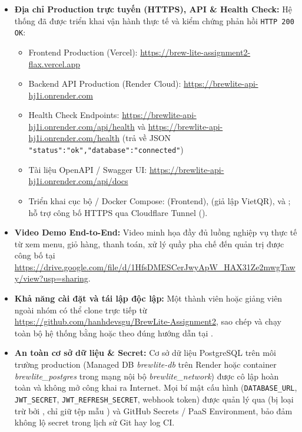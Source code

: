 \documentclass[12pt,a4paper]{report}
\begin{document}
\begin{itemize}[leftmargin=*]
\item \textbf{Địa chỉ Production trực tuyến (HTTPS), API \& Health Check:} Hệ thống đã được triển khai vận hành thực tế và kiểm chứng phản hồi \texttt{HTTP 200 OK}:
  \begin{itemize}[nosep]
  \item Frontend Production (Vercel): \url{https://brew-lite-assignment2-flax.vercel.app}
  \item Backend API Production (Render Cloud): \url{https://brewlite-api-hj1i.onrender.com}
  \item Health Check Endpoints: \url{https://brewlite-api-hj1i.onrender.com/api/health} và \url{https://brewlite-api-hj1i.onrender.com/health} (trả về JSON \texttt{"status":"ok","database":"connected"})
  \item Tài liệu OpenAPI / Swagger UI: \url{https://brewlite-api-hj1i.onrender.com/api/docs}
  \item Triển khai cục bộ / Docker Compose:  (Frontend),  (giả lập VietQR),  và ; hỗ trợ công bố HTTPS qua Cloudflare Tunnel ().
  \end{itemize}
\item \textbf{Video Demo End-to-End:} Video minh họa đầy đủ luồng nghiệp vụ thực tế từ xem menu, giỏ hàng, thanh toán, xử lý quầy pha chế đến quản trị được công bố tại \url{https://drive.google.com/file/d/1HfsDMESCerJwyApW_HAX31Ze2mwgTawy/view?usp=sharing}.
\item \textbf{Khả năng cài đặt và tái lập độc lập:} Một thành viên hoặc giảng viên ngoài nhóm có thể clone trực tiếp từ \url{https://github.com/hanhdevsgu/BrewLite-Assignment2}, sao chép  và chạy toàn bộ hệ thống bằng  hoặc  theo đúng hướng dẫn tại .
\item \textbf{An toàn cơ sở dữ liệu \& Secret:} Cơ sở dữ liệu PostgreSQL trên môi trường production (Managed DB \textit{brewlite-db} trên Render hoặc container \textit{brewlite\_postgres} trong mạng nội bộ \textit{brewlite\_network}) được cô lập hoàn toàn và không mở công khai ra Internet. Mọi bí mật cấu hình (\texttt{DATABASE\_URL}, \texttt{JWT\_SECRET}, \texttt{JWT\_REFRESH\_SECRET}, webhook token) được quản lý qua  (bị loại trừ bởi , chỉ giữ tệp mẫu ) và GitHub Secrets / PaaS Environment, bảo đảm không lộ secret trong lịch sử Git hay log CI.

\end{itemize}
\end{document}
